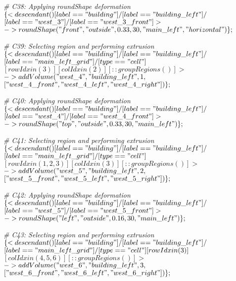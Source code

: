 \noindent \textit{\# C38: Applying roundShape deformation}\\
$\{< descendant() [label=="building"] / [label=="building\_left"] / $\\
$[label=="west\_3"] / [label=="west\_3\_front"] > $\\
$-> roundShape("front", "outside", 0.33, 30, "main\_left", "horizontal")\};$

\noindent \textit{\# C39: Selecting region and performing extrusion}\\
$\{< descendant() [label=="building"] / [label=="building\_left"] / $\\
$[label=="main\_left\_grid"] / [type=="cell"] $\\
$[rowIdx in (3)] [colIdx in (2)] [::groupRegions()] > $\\
$-> addVolume("west\_4", "building\_left", 1, $\\
$["west\_4\_front", "west\_4\_left", "west\_4\_right"])\};$

\noindent \textit{\# C40: Applying roundShape deformation}\\
$\{< descendant() [label=="building"] / [label=="building\_left"] / $\\
$[label=="west\_4"] / [label=="west\_4\_front"] > $\\
$-> roundShape("top", "outside", 0.33, 30, "main\_left")\};$

\noindent \textit{\# C41: Selecting region and performing extrusion}\\
$\{< descendant() [label=="building"] / [label=="building\_left"] / $\\
$[label=="main\_left\_grid"] / [type=="cell"] $\\
$[rowIdx in (1, 2, 3)] [colIdx in (3)] [::groupRegions()] > $\\
$-> addVolume("west\_5", "building\_left", 2, $\\
$["west\_5\_front", "west\_5\_left", "west\_5\_right"])\};$

\noindent \textit{\# C42: Applying roundShape deformation}\\
$\{< descendant() [label=="building"] / [label=="building\_left"] / $\\
$[label=="west\_5"] / [label=="west\_5\_front"] > $\\
$-> roundShape("left", "outside", 0.16, 30, "main\_left")\};$

\noindent \textit{\# C43: Selecting region and performing extrusion}\\
$\{< descendant() [label=="building"] / [label=="building\_left"] / $\\
$[label=="main\_left\_grid"] / [type=="cell"] [rowIdx in (3)] $\\
$[colIdx in (4, 5, 6)] [::groupRegions()] > $\\
$-> addVolume("west\_6", "building\_left", 3, $\\
$["west\_6\_front", "west\_6\_left", "west\_6\_right"])\};$

